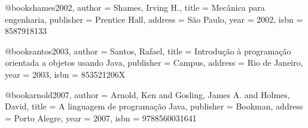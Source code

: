 @book{shames2002,
  author = {Shames, Irving H.},
  title = {Mecânica para engenharia},
  publisher = {Prentice Hall},
  address = {São Paulo},
  year = {2002},%
  isbn = {8587918133}%
}

%

@book{santos2003,
  author = {Santos, Rafael},
  title = {Introdução à programação orientada a objetos usando Java},
  publisher = {Campus},
  address = {Rio de Janeiro},
  year = {2003},
  isbn = {853521206X}
}

@book{arnold2007,
  author = {Arnold, Ken and Gosling, James A. and Holmes, David},
  title = {A linguagem de programação Java},
  publisher = {Bookman},
  address = {Porto Alegre},
  year = {2007},
  isbn = {9788560031641}
} 